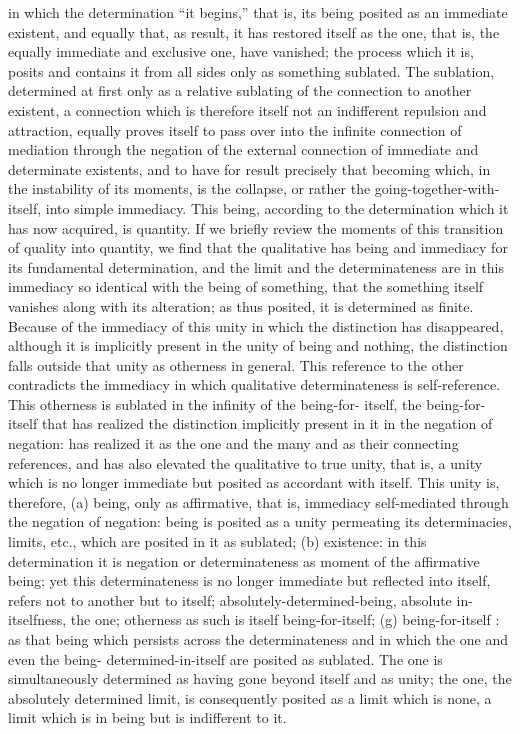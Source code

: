 in which the determination “it begins,” that is, its being posited as an
immediate existent, and equally that, as result, it has restored itself as the
one, that is, the equally immediate and exclusive one, have vanished; the
process which it is, posits and contains it from all sides only as something
sublated. The sublation, determined at first only as a relative sublating of
the connection to another existent, a connection which is therefore itself not
an indifferent repulsion and attraction, equally proves itself to pass over into
the infinite connection of mediation through the negation of the external
connection of immediate and determinate existents, and to have for result
precisely that becoming which, in the instability of its moments, is the
collapse, or rather the going-together-with-itself, into simple immediacy.
This being, according to the determination which it has now acquired, is
quantity.
If we briefly review the moments of this transition of quality into quantity,
we find that the qualitative has being and immediacy for its fundamental
determination, and the limit and the determinateness are in this immediacy
so identical with the being of something, that the something itself vanishes
along with its alteration; as thus posited, it is determined as finite. Because
of the immediacy of this unity in which the distinction has disappeared,
although it is implicitly present in the unity of being and nothing, the
distinction falls outside that unity as otherness in general. This reference to
the other contradicts the immediacy in which qualitative determinateness
is self-reference. This otherness is sublated in the infinity of the being-for-
itself, the being-for-itself that has realized the distinction implicitly present
in it in the negation of negation: has realized it as the one and the many
and as their connecting references, and has also elevated the qualitative to
true unity, that is, a unity which is no longer immediate but posited as
accordant with itself.
This unity is, therefore, (a) being, only as affirmative, that is, immediacy
self-mediated through the negation of negation: being is posited as a unity
permeating its determinacies, limits, etc., which are posited in it as sublated;
(b) existence: in this determination it is negation or determinateness as
moment of the affirmative being; yet this determinateness is no longer
immediate but reflected into itself, refers not to another but to itself;
absolutely-determined-being, absolute in-itselfness, the one; otherness as
such is itself being-for-itself; (g) being-for-itself : as that being which persists
across the determinateness and in which the one and even the being-
determined-in-itself are posited as sublated. The one is simultaneously
determined as having gone beyond itself and as unity; the one, the absolutely
determined limit, is consequently posited as a limit which is none, a limit
which is in being but is indifferent to it.

